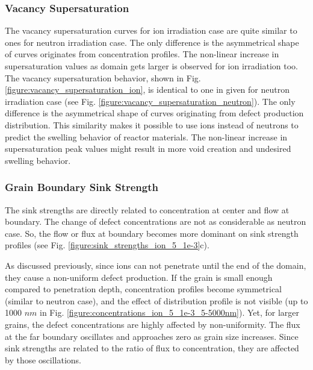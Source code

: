 \documentclass[utf8]{frontiersSCNS} %
\begin{document}
\newpage
\subsubsection{Vacancy Supersaturation}
    The vacancy supersaturation curves for ion irradiation case are quite similar to ones for neutron irradiation case. The only difference is the asymmetrical shape of curves originates from concentration profiles. The non-linear increase in supersaturation values as domain gets larger is observed for ion irradiation too.
    The vacancy supersaturation behavior, shown in Fig. \ref{figure:vacancy_supersaturation_ion}, is identical to one in given for neutron irradiation case (see Fig. \ref{figure:vacancy_supersaturation_neutron}). The only difference is the asymmetrical shape of curves originating from defect production distribution. This similarity makes it possible to use ions instead of neutrons to predict the swelling behavior of reactor materials. The non-linear increase in supersaturation peak values might result in more void creation and undesired swelling behavior.\\

\subsubsection{Grain Boundary Sink Strength}
    The sink strengths are directly related to concentration at center and flow at boundary. The change of defect concentrations are not as considerable as neutron case. So, the flow or flux at boundary becomes more dominant on sink strength profiles (see Fig. \ref{figure:sink_strengths_ion_5_1e-3}c).

    As discussed previously, since ions can not penetrate until the end of the domain, they cause a non-uniform defect production. If the grain is small enough compared to penetration depth, concentration profiles become symmetrical (similar to neutron case), and the effect of distribution profile is not visible (up to 1000 $nm$ in Fig. \ref{figure:concentrations_ion_5_1e-3_5-5000nm}). Yet, for larger grains, the defect concentrations are highly affected by non-uniformity. The flux at the far boundary oscillates and approaches zero as grain size increases. Since sink strengths are related to the ratio of flux to concentration, they are affected by those oscillations.
\end{document}
